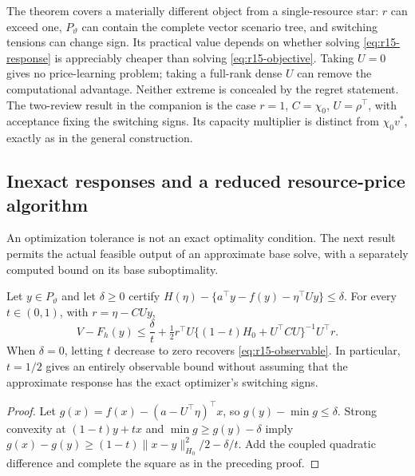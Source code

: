 The theorem covers a materially different object from a single-resource star: $r$ can exceed one, $P_\vartheta$ can contain the complete vector scenario tree, and switching tensions can change sign. Its practical value depends on whether solving \eqref{eq:r15-response} is appreciably cheaper than solving \eqref{eq:r15-objective}. Taking $U=0$ gives no price-learning problem; taking a full-rank dense $U$ can remove the computational advantage. Neither extreme is concealed by the regret statement. The two-review result in the companion is the case $r=1$, $C=\chi_0$, $U=\rho^\top$, with acceptance fixing the switching signs. Its capacity multiplier is distinct from $\chi_0v^*$, exactly as in the general construction.

\subsection{Inexact responses and a reduced resource-price algorithm}
An optimization tolerance is not an exact optimality condition. The next result permits the actual feasible output of an approximate base solve, with a separately computed bound on its base suboptimality.

\begin{proposition}\label{prop:r15-inexact}
Let $y\in P_\vartheta$ and let $\delta\geq0$ certify
$H(\eta)-\{a^\top y-f(y)-\eta^\top Uy\}\leq\delta$.
For every $t\in(0,1)$, with $r=\eta-CUy$,
\begin{equation}\label{eq:r15-inexact}
 V-F_h(y)\leq\frac{\delta}{t}
 +\tfrac12 r^\top U\{(1-t)H_0+U^\top CU\}^{-1}U^\top r.
\end{equation}
When $\delta=0$, letting $t$ decrease to zero recovers \eqref{eq:r15-observable}. In particular, $t=1/2$ gives an entirely observable bound without assuming that the approximate response has the exact optimizer's switching signs.
\end{proposition}
\begin{proof}
Let $g(x)=f(x)-(a-U^\top\eta)^\top x$, so $g(y)-\min g\leq\delta$.
Strong convexity at $(1-t)y+tx$ and $\min g\geq g(y)-\delta$ imply
$g(x)-g(y)\geq(1-t)\|x-y\|_{H_0}^2/2-\delta/t$.
Add the coupled quadratic difference and complete the square as in the preceding proof.
\end{proof}

